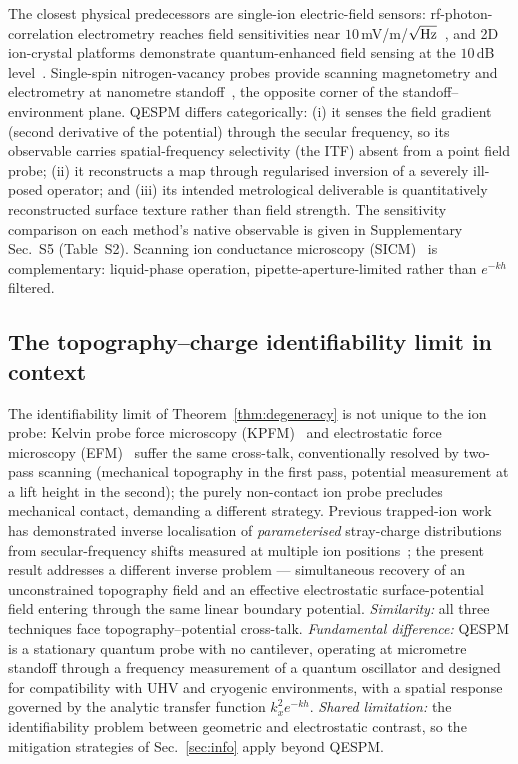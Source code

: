 \documentclass[12pt,a4paper]{article}
\begin{document}
The closest physical predecessors are single-ion electric-field sensors:
rf-photon-correlation electrometry reaches field sensitivities near
$10$\,mV/m/$\sqrt{\rm Hz}$~\cite{keller2015electrometry}, and 2D
ion-crystal platforms demonstrate quantum-enhanced field sensing at the
$10$\,dB level~\cite{gilmore2021quantum}.  Single-spin nitrogen-vacancy
probes provide scanning magnetometry and electrometry at nanometre
standoff~\cite{rondin2014magnetometry}, the opposite corner of the
standoff--environment plane.  QESPM differs categorically:
(i) it senses the field gradient (second derivative of the potential)
through the secular frequency, so its observable carries
spatial-frequency selectivity (the ITF) absent from a point field probe;
(ii) it reconstructs a map through regularised inversion of a severely
ill-posed operator; and (iii) its intended metrological deliverable is
quantitatively reconstructed surface texture rather than field strength.
The
sensitivity comparison on each method's native observable is given in
Supplementary Sec.~S5 (Table~S2).  Scanning ion conductance microscopy
(SICM)~\cite{leitao2021sicm} is complementary: liquid-phase operation,
pipette-aperture-limited rather than $e^{-kh}$ filtered.

\subsection{The topography--charge identifiability limit in context}

The identifiability limit of Theorem~\ref{thm:degeneracy} is not unique
to the ion probe: Kelvin probe force microscopy (KPFM)~\cite{glatzel2022kelvin}
and electrostatic force microscopy (EFM)~\cite{serry2000efm} suffer the
same cross-talk, conventionally resolved by two-pass scanning (mechanical
topography in the first pass, potential measurement at a lift height in
the second); the purely non-contact ion probe precludes mechanical
contact, demanding a different strategy.  Previous trapped-ion work has
demonstrated inverse localisation of \emph{parameterised} stray-charge
distributions from secular-frequency shifts measured at multiple ion
positions~\cite{jung2023stray}; the present result addresses a different
inverse problem --- simultaneous recovery of an unconstrained topography
field and an effective electrostatic surface-potential field entering
through the same linear boundary potential.  \emph{Similarity:} all
three techniques face topography--potential cross-talk.
\emph{Fundamental difference:} QESPM is a stationary quantum probe with
no cantilever, operating at micrometre standoff through a frequency
measurement of a quantum oscillator and designed for compatibility with
UHV and cryogenic environments, with a spatial response governed by the
analytic
transfer function $k_x^2e^{-kh}$.  \emph{Shared limitation:} the
identifiability problem between geometric and electrostatic contrast, so
the mitigation strategies of Sec.~\ref{sec:info} apply beyond QESPM.
\end{document}
